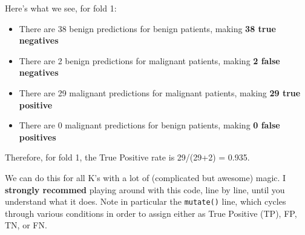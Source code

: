 \documentclass[]{article}
\providecommand{\tightlist}{%
  \setlength{\itemsep}{0pt}\setlength{\parskip}{0pt}}
\begin{document}
Here's what we see, for fold 1:

\begin{itemize}
\tightlist
\item
  There are 38 benign predictions for benign patients, making \textbf{38
  true negatives}
\item
  There are 2 benign predictions for malignant patients, making
  \textbf{2 false negatives}
\item
  There are 29 malignant predictions for malignant patients, making
  \textbf{29 true positive}
\item
  There are 0 malignant predictions for benign patients, making
  \textbf{0 false positives}
\end{itemize}

Therefore, for fold 1, the True Positive rate is 29/(29+2) = 0.935.

We can do this for all K's with a lot of (complicated but awesome)
magic. I \textbf{strongly recommed} playing around with this code, line
by line, until you understand what it does. Note in particular the
\texttt{mutate()} line, which cycles through various conditions in order
to assign either as True Positive (TP), FP, TN, or FN.
\end{document}
